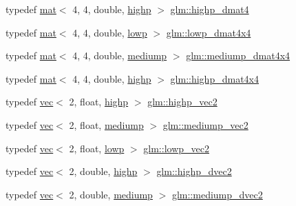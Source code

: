 \begin{DoxyCompactItemize}
\item 
typedef \hyperlink{structglm_1_1mat}{mat}$<$ 4, 4, double, \hyperlink{namespaceglm_a36ed105b07c7746804d7fdc7cc90ff25ac6f7eab42eacbb10d59a58e95e362074}{highp} $>$ \hyperlink{group__core__precision_ga878bb8f4881dbf688ab9bbb5e2944a54}{glm\+::highp\+\_\+dmat4}
\item 
typedef \hyperlink{structglm_1_1mat}{mat}$<$ 4, 4, double, \hyperlink{namespaceglm_a36ed105b07c7746804d7fdc7cc90ff25ae161af3fc695e696ce3bf69f7332bc2d}{lowp} $>$ \hyperlink{group__core__precision_ga336afc91799f59d9075eb94c3093612f}{glm\+::lowp\+\_\+dmat4x4}
\item 
typedef \hyperlink{structglm_1_1mat}{mat}$<$ 4, 4, double, \hyperlink{namespaceglm_a36ed105b07c7746804d7fdc7cc90ff25a6416f3ea0c9025fb21ed50c4d6620482}{mediump} $>$ \hyperlink{group__core__precision_ga53d2b544e1cf6812ed3b2f152d16a770}{glm\+::mediump\+\_\+dmat4x4}
\item 
typedef \hyperlink{structglm_1_1mat}{mat}$<$ 4, 4, double, \hyperlink{namespaceglm_a36ed105b07c7746804d7fdc7cc90ff25ac6f7eab42eacbb10d59a58e95e362074}{highp} $>$ \hyperlink{group__core__precision_gad3df38df8c4f7ef9b38f03581ff60142}{glm\+::highp\+\_\+dmat4x4}
\item 
typedef \hyperlink{structglm_1_1vec}{vec}$<$ 2, float, \hyperlink{namespaceglm_a36ed105b07c7746804d7fdc7cc90ff25ac6f7eab42eacbb10d59a58e95e362074}{highp} $>$ \hyperlink{group__core__precision_gad588ab946806864499d6559c186ce3ba}{glm\+::highp\+\_\+vec2}
\item 
typedef \hyperlink{structglm_1_1vec}{vec}$<$ 2, float, \hyperlink{namespaceglm_a36ed105b07c7746804d7fdc7cc90ff25a6416f3ea0c9025fb21ed50c4d6620482}{mediump} $>$ \hyperlink{group__core__precision_ga96e0011dd4d124d28fd52ef2f0c6f299}{glm\+::mediump\+\_\+vec2}
\item 
typedef \hyperlink{structglm_1_1vec}{vec}$<$ 2, float, \hyperlink{namespaceglm_a36ed105b07c7746804d7fdc7cc90ff25ae161af3fc695e696ce3bf69f7332bc2d}{lowp} $>$ \hyperlink{group__core__precision_gaade87cebca8e38717e38c18df8fc9c8a}{glm\+::lowp\+\_\+vec2}
\item 
typedef \hyperlink{structglm_1_1vec}{vec}$<$ 2, double, \hyperlink{namespaceglm_a36ed105b07c7746804d7fdc7cc90ff25ac6f7eab42eacbb10d59a58e95e362074}{highp} $>$ \hyperlink{group__core__precision_gadec51e8e57b72d8fc95e87f18d1ad4dd}{glm\+::highp\+\_\+dvec2}
\item 
typedef \hyperlink{structglm_1_1vec}{vec}$<$ 2, double, \hyperlink{namespaceglm_a36ed105b07c7746804d7fdc7cc90ff25a6416f3ea0c9025fb21ed50c4d6620482}{mediump} $>$ \hyperlink{group__core__precision_ga71307e1aa231cbc5d9de712a92714496}{glm\+::mediump\+\_\+dvec2}

\end{DoxyCompactItemize}
